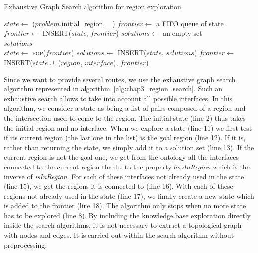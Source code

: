 \begin{algorithm}[!htb]
\caption{Exhaustive Graph Search algorithm for region exploration}
\label{alg:chap3_region_search}
\begin{algorithmic}[1]
	\State $state \leftarrow$ ($problem$.initial\_region, \_) 
    \State $frontier\leftarrow$ a FIFO queue of state
    \State $frontier\leftarrow$ \textsc{INSERT}($state$, $frontier$)
    \State $solutions\leftarrow$ an empty set
    \\
    \Loop
        	\State \Return $solutions$
        \EndIf
        \\
        \State $state\leftarrow$ \textsc{pop}($frontier$)
        	\State $solutions\leftarrow$ \textsc{INSERT}($state$, $solutions$)
        \Else
        				\State $frontier\leftarrow$ \textsc{INSERT}($state \cup$ ($region$, $interface$), $frontier$)
        			\EndIf
        		\EndFor
        	\EndFor
        \EndIf
    \EndLoop
\EndFunction
\end{algorithmic}
\end{algorithm}

Since we want to provide several routes, we use the exhaustive graph search algorithm represented in algorithm~\ref{alg:chap3_region_search}. Such an exhaustive search allows to take into account all possible interfaces. In this algorithm, we consider a state as being a list of pairs composed of a region and the intersection used to come to the region. The initial state (line 2) thus takes the initial region and no interface. When we explore a state (line 11) we first test if its current region (the last one in the list) is the goal region (line 12). If it is, rather than returning the state, we simply add it to a solution set (line 13). If the current region is not the goal one, we get from the ontology all the interfaces connected to the current region thanks to the property \textit{hasInRegion} which is the inverse of \textit{isInRegion}. For each of these interfaces not already used in the state (line 15), we get the regions it is connected to (line 16). With each of these regions not already used in the state (line 17), we finally create a new state which is added to the frontier (line 18). The algorithm only stops when no more state has to be explored (line 8). By including the knowledge base exploration directly inside the search algorithms, it is not necessary to extract a topological graph with nodes and edges. It is carried out within the search algorithm without preprocessing.


